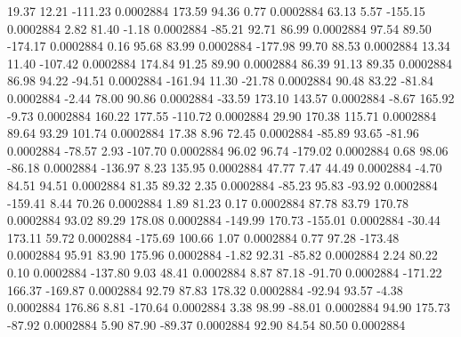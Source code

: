        19.37       12.21     -111.23     0.0002884
      173.59       94.36        0.77     0.0002884
       63.13        5.57     -155.15     0.0002884
        2.82       81.40       -1.18     0.0002884
      -85.21       92.71       86.99     0.0002884
       97.54       89.50     -174.17     0.0002884
        0.16       95.68       83.99     0.0002884
     -177.98       99.70       88.53     0.0002884
       13.34       11.40     -107.42     0.0002884
      174.84       91.25       89.90     0.0002884
       86.39       91.13       89.35     0.0002884
       86.98       94.22      -94.51     0.0002884
     -161.94       11.30      -21.78     0.0002884
       90.48       83.22      -81.84     0.0002884
       -2.44       78.00       90.86     0.0002884
      -33.59      173.10      143.57     0.0002884
       -8.67      165.92       -9.73     0.0002884
      160.22      177.55     -110.72     0.0002884
       29.90      170.38      115.71     0.0002884
       89.64       93.29      101.74     0.0002884
       17.38        8.96       72.45     0.0002884
      -85.89       93.65      -81.96     0.0002884
      -78.57        2.93     -107.70     0.0002884
       96.02       96.74     -179.02     0.0002884
        0.68       98.06      -86.18     0.0002884
     -136.97        8.23      135.95     0.0002884
       47.77        7.47       44.49     0.0002884
       -4.70       84.51       94.51     0.0002884
       81.35       89.32        2.35     0.0002884
      -85.23       95.83      -93.92     0.0002884
     -159.41        8.44       70.26     0.0002884
        1.89       81.23        0.17     0.0002884
       87.78       83.79      170.78     0.0002884
       93.02       89.29      178.08     0.0002884
     -149.99      170.73     -155.01     0.0002884
      -30.44      173.11       59.72     0.0002884
     -175.69      100.66        1.07     0.0002884
        0.77       97.28     -173.48     0.0002884
       95.91       83.90      175.96     0.0002884
       -1.82       92.31      -85.82     0.0002884
        2.24       80.22        0.10     0.0002884
     -137.80        9.03       48.41     0.0002884
        8.87       87.18      -91.70     0.0002884
     -171.22      166.37     -169.87     0.0002884
       92.79       87.83      178.32     0.0002884
      -92.94       93.57       -4.38     0.0002884
      176.86        8.81     -170.64     0.0002884
        3.38       98.99      -88.01     0.0002884
       94.90      175.73      -87.92     0.0002884
        5.90       87.90      -89.37     0.0002884
       92.90       84.54       80.50     0.0002884
